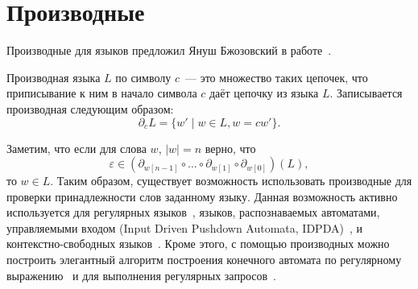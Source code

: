 \section{Производные}
\label{sec:Derivatives}

Производные для языков предложил Януш Бжозовский в работе~.

\begin{definition}
    Производная языка $L$ по символу $c$~--- это множество таких цепочек, что приписывание к ним в начало символа $c$ даёт цепочку из языка $L$.
    Записывается производная следующим образом: \[\partial_c L = \{ w' \mid w \in L, w = cw'\}.\]
\end{definition}

Заметим, что если для слова $w$, $|w| = n$ верно, что
\[\varepsilon \in (\partial_{w[n-1]} \circ \dots \circ \partial_{w[1]} \circ \partial_{w[0]}) (L),\]
то $w \in L$.
Таким образом, существует возможность использовать производные для проверки принадлежности слов заданному языку.
Данная возможность активно используется для регулярных языков~, языков, распознаваемых автоматами, управляемыми входом (Input Driven Pushdown Automata, IDPDA)~, и контекстно-свободных языков~.
Кроме этого, с помощью производных можно построить элегантный алгоритм построения конечного автомата по регулярному выражению~ и для выполнения регулярных запросов~.
